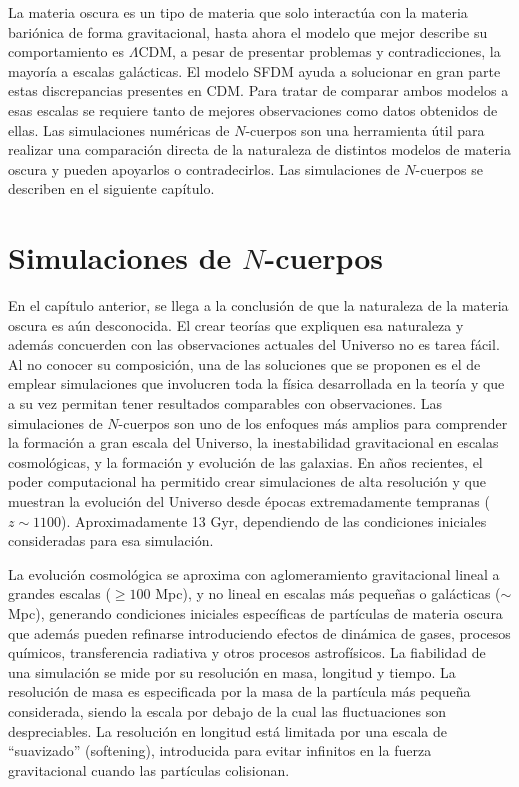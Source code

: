 \documentclass[a4paper,openright,12pt]{book}
\begin{document}
La materia oscura es un tipo de materia que solo interactúa con la materia bariónica de forma gravitacional, hasta ahora el modelo que mejor describe su comportamiento es $\Lambda$CDM, a pesar de presentar problemas y contradicciones, la mayoría a escalas galácticas. El modelo SFDM ayuda a solucionar en gran parte estas discrepancias presentes en CDM. Para tratar de comparar ambos modelos a esas escalas se requiere tanto de mejores observaciones como datos obtenidos de ellas. Las simulaciones numéricas de $N$-cuerpos son una herramienta útil para realizar una comparación directa de la naturaleza de distintos modelos de materia oscura y pueden apoyarlos o contradecirlos. Las simulaciones de $N$-cuerpos se describen en el siguiente capítulo.




\chapter{Simulaciones de $N$-cuerpos}\label{cap.nudo}
En el capítulo anterior, se llega a la conclusión de que la naturaleza de la materia oscura es aún desconocida. El crear teorías que expliquen esa naturaleza y además concuerden con las observaciones actuales del Universo no es tarea fácil. Al no conocer su composición, una de las soluciones que se proponen es el de emplear simulaciones que involucren toda la física desarrollada en la teoría y que a su vez permitan tener resultados comparables con observaciones. Las simulaciones de $N$-cuerpos son uno de los enfoques más amplios para comprender la formación a gran escala del Universo, la inestabilidad gravitacional en escalas cosmológicas, y la formación y evolución de las galaxias. En años recientes, el poder computacional ha permitido crear simulaciones de alta resolución y que muestran la evolución del Universo desde épocas extremadamente tempranas ($z \sim 1100$). Aproximadamente 13 Gyr, dependiendo de las condiciones iniciales consideradas para esa simulación.

La evolución cosmológica se aproxima con aglomeramiento gravitacional lineal a grandes escalas ($\geq100$ Mpc), y no lineal en escalas más pequeñas o galácticas ($\sim$ Mpc), generando condiciones iniciales específicas de partículas de materia oscura que además pueden refinarse introduciendo efectos de dinámica de gases, procesos químicos, transferencia radiativa y otros procesos astrofísicos. La fiabilidad de una simulación se mide por su resolución en masa, longitud y tiempo. La resolución de masa es especificada por la masa de la partícula más pequeña considerada, siendo la escala por debajo de la cual las fluctuaciones son despreciables. La resolución en longitud está limitada por una escala de ``suavizado'' (softening), introducida para evitar infinitos en la fuerza gravitacional cuando las partículas colisionan.
\end{document}
